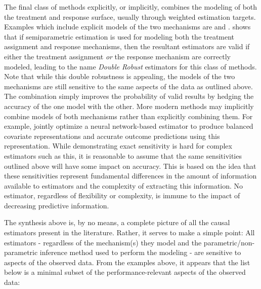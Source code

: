 \documentclass[../main.tex]{subfiles}
\begin{document}
\vspace{\baselineskip}
The final class of methods explicitly, or implicitly, combines the modeling of both the treatment and response surface, usually through weighted estimation targets. Examples which include explicit models of the two mechanisms are \textcite{Rubin2000CombiningCovariates} and \textcite{Robins1995SemiparametricData}. \textcite{Scharfstein1999AdjustingRejoinder} shows that if semiparametric estimation is used for modeling both the treatment assignment and response mechanisms, then the resultant estimators are valid if either the treatment assignment \textit{or }the response mechanism are correctly modeled, leading to the name \textit{Double Robust}  estimators for this class of methods. Note that while this double robustness is appealing, the models of the two mechanisms are still sensitive to the same aspects of the data as outlined above. The combination simply improves the probability of valid results by hedging the accuracy of the one model with the other. More modern methods may implicitly combine models of both mechanisms rather than explicitly combining them. For example, \textcite{Johansson2016LearningInference} jointly optimize a neural network-based estimator to produce balanced covariate representations and accurate outcome predictions using this representation. While demonstrating exact sensitivity is hard for complex estimators such as this, it is reasonable to assume that the same sensitivities outlined above will have some impact on accuracy. This is based on the idea that these sensitivities represent fundamental differences in the amount of information available to estimators and the complexity of extracting this information. No estimator, regardless of flexibility or complexity, is immune to the impact of decreasing predictive information.\par


\vspace{\baselineskip}
The synthesis above is, by no means, a complete picture of all the causal estimators present in the literature. Rather, it serves to make a simple point: All estimators - regardless of the mechanism(s) they model and the parametric/non-parametric inference method used to perform the modeling - are sensitive to aspects of the observed data. From the examples above, it appears that the list below is a minimal subset of the performance-relevant aspects of the observed data:\par
\end{document}

